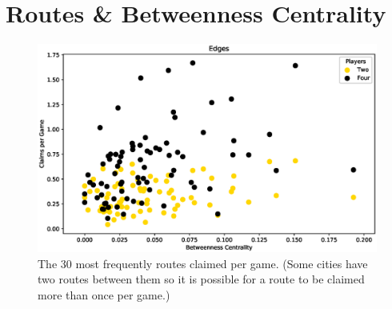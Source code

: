 \section{Routes \& Betweenness Centrality}

\begin{figure}[!ht]
\centering
\includegraphics[scale=.7]{figures/centrality_betweenness}
\caption{The 30 most frequently routes claimed
per game.
(Some cities have two routes between them so it is
possible for a route to be claimed more than once per game.)}
\label{fig:routes}
\end{figure}